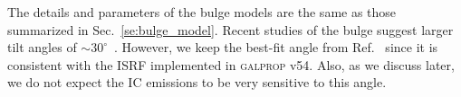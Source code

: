\documentclass[doublespace,nopageskip]{VTthesis} %
\begin{document}
The details and parameters of the bulge models are the same as those summarized in Sec.~\ref{se:bulge_model}. Recent studies of the bulge suggest larger tilt angles of $\sim 30^\circ$~\cite{2013MNRAS.434..595C,2017MNRAS.465.1621P}. However, we keep the best-fit angle from Ref.~\cite{1998ApJ...492..495F} since it is consistent with the ISRF implemented in \textsc{galprop} v54. Also, as we discuss later, we do not expect the IC emissions to be very sensitive to this angle.



\end{document}
